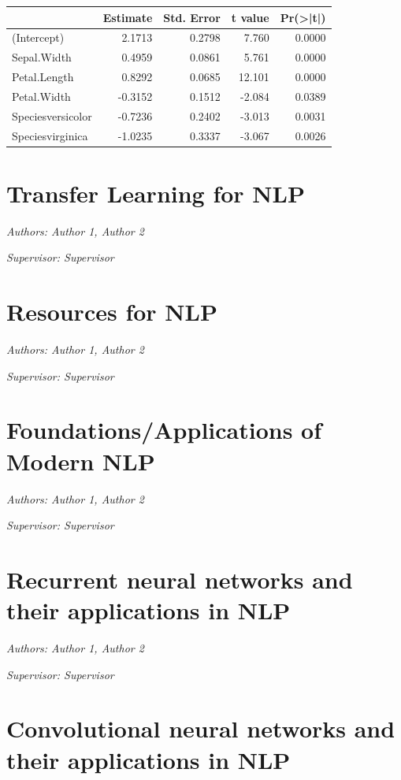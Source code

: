 \documentclass[]{krantz}
\begin{document}
\begin{tabular}{l|r|r|r|r}
\hline
  & Estimate & Std. Error & t value & Pr(>|t|)\\
\hline
(Intercept) & 2.1713 & 0.2798 & 7.760 & 0.0000\\
\hline
Sepal.Width & 0.4959 & 0.0861 & 5.761 & 0.0000\\
\hline
Petal.Length & 0.8292 & 0.0685 & 12.101 & 0.0000\\
\hline
Petal.Width & -0.3152 & 0.1512 & -2.084 & 0.0389\\
\hline
Speciesversicolor & -0.7236 & 0.2402 & -3.013 & 0.0031\\
\hline
Speciesvirginica & -1.0235 & 0.3337 & -3.067 & 0.0026\\
\hline
\end{tabular}

\chapter{Transfer Learning for NLP}\label{transfer-learning-for-nlp}

\emph{Authors: Author 1, Author 2}

\emph{Supervisor: Supervisor}

\chapter{Resources for NLP}\label{resources-for-nlp}

\emph{Authors: Author 1, Author 2}

\emph{Supervisor: Supervisor}

\chapter{Foundations/Applications of Modern
NLP}\label{foundationsapplications-of-modern-nlp}

\emph{Authors: Author 1, Author 2}

\emph{Supervisor: Supervisor}

\chapter{Recurrent neural networks and their applications in
NLP}\label{recurrent-neural-networks-and-their-applications-in-nlp}

\emph{Authors: Author 1, Author 2}

\emph{Supervisor: Supervisor}

\chapter{Convolutional neural networks and their applications in
NLP}\label{convolutional-neural-networks-and-their-applications-in-nlp}
\end{document}
